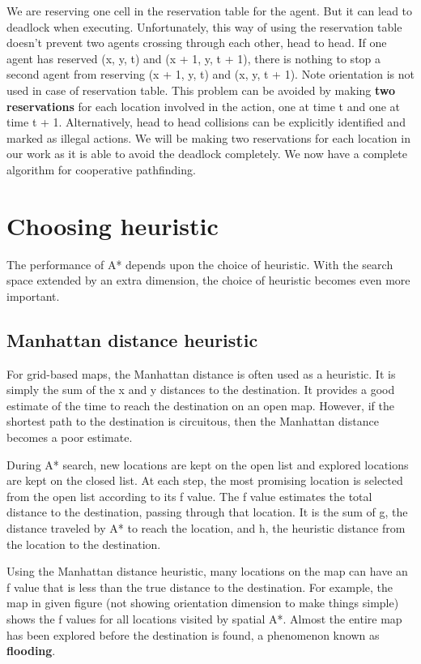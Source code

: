 We are reserving one cell in the reservation table for the agent. But it can lead to deadlock when executing.
Unfortunately, this way of using the reservation table doesn’t prevent two agents crossing
through each other, head to head. If one agent has reserved (x, y, t) and (x + 1, y, t + 1),
there is nothing to stop a second agent from reserving (x + 1, y, t) and (x, y, t + 1). Note orientation 
is not used in case of reservation table. This
problem can be avoided by making \textbf{two reservations} for each location involved in the
action, one at time t and one at time t + 1. Alternatively, head to head collisions can be
explicitly identified and marked as illegal actions. We will be making two reservations for each location 
in our work as it is able to avoid the deadlock completely. We now have a complete algorithm for cooperative pathfinding.

\section{Choosing heuristic}
The performance of A* depends upon the choice of heuristic. With the search space
extended by an extra dimension, the choice of heuristic becomes even more important.

\subsection{Manhattan distance heuristic}
For grid-based maps, the Manhattan distance is often used as a heuristic. It is simply the
sum of the x and y distances to the destination. It provides a good estimate of the time to
reach the destination on an open map. However, if the shortest path to the destination is
circuitous, then the Manhattan distance becomes a poor estimate.

\vspace{\baselineskip}
During A* search, new locations are kept on the open list and explored locations are kept
on the closed list. At each step, the most promising location is selected from the open list
according to its f value. The f value estimates the total distance to the destination, passing
through that location. It is the sum of g, the distance traveled by A* to reach the location,
and h, the heuristic distance from the location to the destination.

Using the Manhattan distance heuristic, many locations on the map can have an f value
that is less than the true distance to the destination. For example, the map in given figure (not showing orientation dimension 
to make things simple)
shows the f values for all locations visited by spatial A*. Almost the entire map has been
explored before the destination is found, a phenomenon known as \textbf{flooding}.

